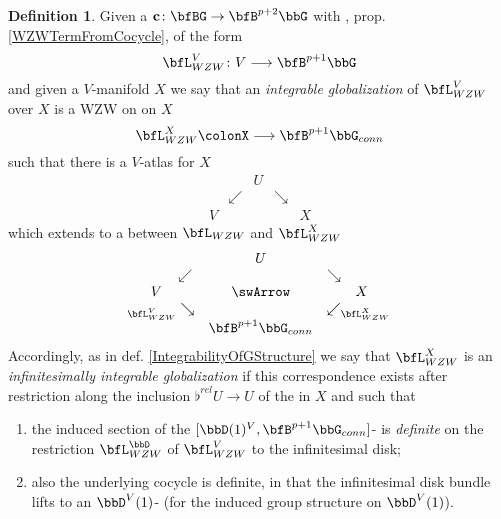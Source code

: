 \documentclass[12pt,titlepage]{article}
\def\mathllap{\mathpalette\mathllapinternal}
\def\mathrlap{\mathpalette\mathrlapinternal}
\def\mathllapinternal#1#2{\llap{$\mathsurround=0pt#1{#2}$}}
\def\mathrlapinternal#1#2{\rlap{$\mathsurround=0pt#1{#2}$}}
\newcommand{\itexarray}[1]{\begin{matrix}#1\end{matrix}}
\theoremstyle{plain}
\theoremstyle{definition}
\newtheorem{defn}{Definition}
\theoremstyle{remark}
\begin{document}
\begin{defn}
\label{DefiniteGlobalizationofWZWTerm}\hypertarget{DefiniteGlobalizationofWZWTerm}{}
Given a  $\mathbf{c} \colon \bfBG\to\bfB^{p+2}\bbG$ with , prop. \ref{WZWTermFromCocycle}, of the form
\begin{displaymath}
\bfL_{WZW}^V
\colon
V \longrightarrow \bfB^{p+1}\bbG
\end{displaymath}
and given a $V$-manifold $X$ we say that an \emph{integrable globalization} of $\bfL_{WZW}^V$ over $X$ is a WZW on on $X$
\begin{displaymath}
\bfL_{WZW}^X \colonX \longrightarrow \bfB^{p+1}\bbG_{conn}
\end{displaymath}
such that there is a $V$-atlas for $X$
\begin{displaymath}
\itexarray{
&& U
\\
& \swarrow && \searrow
\\
V && && X
}
\end{displaymath}
which extends to a  between $\bfL_{WZW}$ and $\bfL_{WZW}^X$
\begin{displaymath}
\itexarray{
&& U
\\
& \swarrow && \searrow
\\
V && \swArrow && X
\\
& {}_{\mathllap{\bfL_{WZW}^V}}\searrow && \swarrow_{\mathrlap{\bfL_{WZW}^X}}
\\
&& \bfB^{p+1}\bbG_{conn}
}
\end{displaymath}
Accordingly, as in def. \ref{IntegrabilityOfGStructure} we say that $\bfL_{WZW}^X$ is an \emph{infinitesimally integrable globalization} if this correspondence exists after restriction along the inclusion $\flat^{rel} U \to U$ of the  in $X$ and such that
\begin{enumerate}%
\item the induced section of the  $[\bbD(1)^V,\bfB^{p+1}\bbG_{conn}]$- is \emph{definite} on the restriction $\bfL_{WZW}^{\bbD}$ of $\bfL_{WZW}^V$ to the infinitesimal disk;
\item also the underlying cocycle is definite, in that the infinitesimal disk bundle lifts to an $\bbD^V(1)$- (for the induced group structure on $\bbD^V(1)$).
\end{enumerate}
\end{defn}
\end{document}
